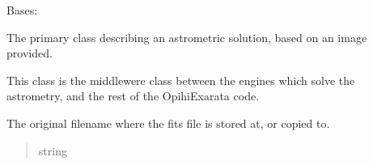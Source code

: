 \documentclass[letterpaper,11pt,english]{sphinxmanual}
\begin{document}
\begin{savenotes}\begin{fulllineitems}
\label{\detokenize{code/opihiexarata.astrometry.solution:opihiexarata.astrometry.solution.AstrometricSolution}}
\pysigstartsignatures
{}
\pysigstopsignatures
\sphinxAtStartPar
Bases: {\hyperref[\detokenize{code/opihiexarata.library.engine:opihiexarata.library.engine.ExarataSolution}]{}}

\sphinxAtStartPar
The primary class describing an astrometric solution, based on an image
provided.

\sphinxAtStartPar
This class is the middlewere class between the engines which solve the
astrometry, and the rest of the OpihiExarata code.

\begin{savenotes}\begin{fulllineitems}
\label{\detokenize{code/opihiexarata.astrometry.solution:opihiexarata.astrometry.solution.AstrometricSolution._original_filename}}
\pysigstartsignatures
{}
\pysigstopsignatures
\sphinxAtStartPar
The original filename where the fits file is stored at, or copied to.
\begin{quote}\begin{description}
\sphinxAtStartPar
string

\end{description}\end{quote}

\end{fulllineitems}\end{savenotes}


\end{fulllineitems}
\end{savenotes}
\end{document}
